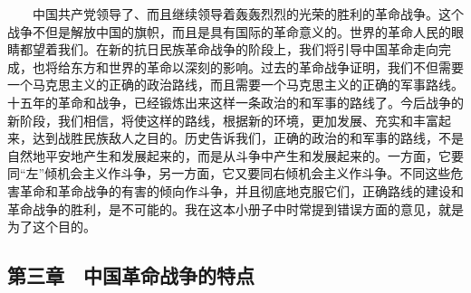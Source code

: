 \documentclass[cn,11pt,chinese]{elegantbook}
\def\myformat#1{\hfil\hfil #1}
\begin{document}
　　中国共产党领导了、而且继续领导着轰轰烈烈的光荣的胜利的革命战争。这个战争不但是解放中国的旗帜，而且是具有国际的革命意义的。世界的革命人民的眼睛都望着我们。在新的抗日民族革命战争的阶段上，我们将引导中国革命走向完成，也将给东方和世界的革命以深刻的影响。过去的革命战争证明，我们不但需要一个马克思主义的正确的政治路线，而且需要一个马克思主义的正确的军事路线。十五年的革命和战争，已经锻炼出来这样一条政治的和军事的路线了。今后战争的新阶段，我们相信，将使这样的路线，根据新的环境，更加发展、充实和丰富起来，达到战胜民族敌人之目的。历史告诉我们，正确的政治的和军事的路线，不是自然地平安地产生和发展起来的，而是从斗争中产生和发展起来的。一方面，它要同“左”倾机会主义作斗争，另一方面，它又要同右倾机会主义作斗争。不同这些危害革命和革命战争的有害的倾向作斗争，并且彻底地克服它们，正确路线的建设和革命战争的胜利，是不可能的。我在这本小册子中时常提到错误方面的意见，就是为了这个目的。\\
\subsection*{\myformat{第三章　中国革命战争的特点}}
\end{document}
